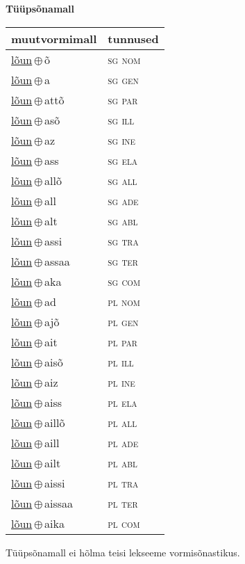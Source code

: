 

\vspace{3.5em}
\noindent \begin{minipage}{\textwidth}
\noindent \textbf{Tüüpsõnamall \,}\\

\begin{sideways}
\begin{tabular}{l l}
muutvormimall & tunnused \\
\hline
\underline{lõun}\,$\oplus$\,õ & \textsc{ sg nom } \\
\underline{lõun}\,$\oplus$\,a & \textsc{ sg gen } \\
\underline{lõun}\,$\oplus$\,attõ & \textsc{ sg par } \\
\underline{lõun}\,$\oplus$\,asõ & \textsc{ sg ill } \\
\underline{lõun}\,$\oplus$\,az & \textsc{ sg ine } \\
\underline{lõun}\,$\oplus$\,ass & \textsc{ sg ela } \\
\underline{lõun}\,$\oplus$\,allõ & \textsc{ sg all } \\
\underline{lõun}\,$\oplus$\,all & \textsc{ sg ade } \\
\underline{lõun}\,$\oplus$\,alt & \textsc{ sg abl } \\
\underline{lõun}\,$\oplus$\,assi & \textsc{ sg tra } \\
\underline{lõun}\,$\oplus$\,assaa & \textsc{ sg ter } \\
\underline{lõun}\,$\oplus$\,aka & \textsc{ sg com } \\
\underline{lõun}\,$\oplus$\,ad & \textsc{ pl nom } \\
\underline{lõun}\,$\oplus$\,ajõ & \textsc{ pl gen } \\
\underline{lõun}\,$\oplus$\,ait & \textsc{ pl par } \\
\underline{lõun}\,$\oplus$\,aisõ & \textsc{ pl ill } \\
\underline{lõun}\,$\oplus$\,aiz & \textsc{ pl ine } \\
\underline{lõun}\,$\oplus$\,aiss & \textsc{ pl ela } \\
\underline{lõun}\,$\oplus$\,aillõ & \textsc{ pl all } \\
\underline{lõun}\,$\oplus$\,aill & \textsc{ pl ade } \\
\underline{lõun}\,$\oplus$\,ailt & \textsc{ pl abl } \\
\underline{lõun}\,$\oplus$\,aissi & \textsc{ pl tra } \\
\underline{lõun}\,$\oplus$\,aissaa & \textsc{ pl ter } \\
\underline{lõun}\,$\oplus$\,aika & \textsc{ pl com } \\
\end{tabular}
\end{sideways}
\label{tab:tüüpsõnamall-lõunõ}

\end{minipage}

 
\vspace{1em}
\noindent Tüüpsõnamall  ei hõlma teisi lekseeme vormi\-sõnastikus.
